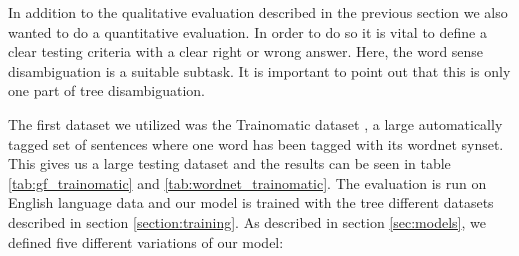 In addition to the qualitative evaluation described in the previous section we also wanted to do a quantitative evaluation. In order to do so it is vital to define a clear testing criteria with a clear right or wrong answer. Here, the word sense disambiguation is a suitable subtask. It is important to point out that this is only one part of tree disambiguation.

The first dataset we utilized was the Trainomatic dataset \citep{pasini2017trainomatic}, a large automatically tagged set of sentences where one word has been tagged with its wordnet synset. This gives us a large testing dataset and the results can be seen in table \ref{tab:gf_trainomatic} and \ref{tab:wordnet_trainomatic}. The evaluation is run on English language data and our model is trained with the tree different datasets described in section \ref{section:training}. As described in section \ref{sec:models}, we defined five different variations of our model:

